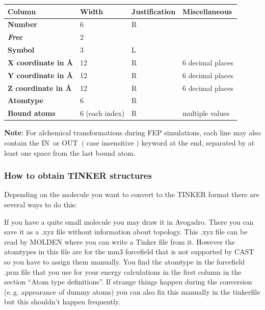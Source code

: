 \documentclass[10pt,a4paper]{article} %
\begin{document}
	\begin{longtable}{|l|l|l|l}
		Column & Width & Justification & Miscellaneous\\
		\hline
		\textbf{Number}	& 6			& R	& ~\\
		\textbf{\textit{Free}}	& 2			&  ~ & ~\\
		\textbf{Symbol}	& 3			& L	& ~\\
		\textbf{X coordinate in \AA}	& 12			& R & 6 decimal places\\
		\textbf{Y coordinate in \AA}	& 12			 & R & 6 decimal places\\
		\textbf{Z coordinate in \AA}	& 12			& R	& 6 decimal places\\
		\textbf{Atomtype}	& 6			& R	& ~\\
		\textbf{Bound atoms}	& 6 (each index)			& R	& multiple values\\
	\end{longtable}
	\textbf{Note}: For alchemical transformations during \acl{FEP} simulations, each line may also contain the \glqq IN\grqq~or \glqq OUT\grqq~$($ case insensitive $)$ keyword at the end, separated by at least one space from the last bound atom.

	
	\subsubsection{How to obtain TINKER structures} \label{sec:tinker}
	
	Depending on the molecule you want to convert to the TINKER format there are several ways to do this:
	
	If you have a quite small molecule you may draw it in Avogadro. There you can save it as a .xyz file without information about topology. This .xyz file can be read by MOLDEN where you can write a Tinker file from it. However the atomtypes in this file are for the mm3 forcefield that is not supported by \ac{CAST} so you have to assign them manually. You find the atomtype in the forcefield .prm file that you use for your energy calculations in the first column in the section ``Atom type definitions''. If strange things happen during the conversion (e.\,g. appearance of dummy atoms) you can also fix this manually in the tinkerfile but this shouldn't happen frequently.
	
\end{document}
